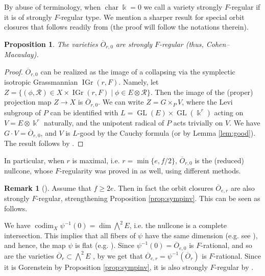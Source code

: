 \documentclass[11pt]{amsart}
\numberwithin{equation}{section}
\newtheorem{proposition}[equation]{Proposition}
\theoremstyle{definition}
\newtheorem{rmk}[equation]{Remark}
\newenvironment{remark}[1][]{\begin{rmk}[#1] \pushQED{\qed}}{\popQED \end{rmk}}
\DeclareMathOperator{\codim}{codim}
\DeclareMathOperator{\GL}{GL}
\DeclareMathOperator{\cha}{char}
\newcommand{\op}{\operatorname}
\newcommand{\oo}{\otimes}
\newcommand{\mc}{\mathcal}
\newcommand{\ol}{\overline}
\newcommand{\kk}{\Bbbk}
\begin{document}
By abuse of terminology, when $\cha \kk = 0$ we call a variety strongly $F$-regular if it is of strongly $F$-regular type. We mention a sharper result for special orbit closures that follows readily from \cite[Theorem 1.2]{me} (the proof will follow the notations therein).

\begin{proposition}\label{prop:special1}
The varieties $\ol{O}_{r,0}$ are strongly $F$-regular (thus, Cohen--Macaulay).
\end{proposition}

\begin{proof}
$\ol{O}_{r,0}$ can be realized as the image of a collapsing via the symplectic isotropic Grassmannian $\op{IGr}(r, F)$. Namely, let $Z=\{(\phi, \mc{R}) \in X \times \op{IGr}(r,F) \mid \phi \in E\oo \mc{R}\}$. Then the image of the (proper) projection map $Z \to X$ is $\ol{O}_{r,0}$. We can write $Z=G \times_P V$, where the Levi subgroup of $P$ can be identified with $L=\GL(E) \times \GL(\kk^{r})$ acting on $V=E\oo \kk^{r}$ naturally, and the unipotent radical of $P$ acts trivially on $V$. We have $G \cdot V = \ol{O}_{r,0}$, and $V$ is $L$-good by the Cauchy formula \cite[Theorem 2.3.2]{weymanbook} (or by Lemma \ref{lem:good}). The result follows by \cite[Theorems 1.2 and 1.3]{me}.
\end{proof}

In particular, when $r$ is maximal, i.e. $r=\min\{e,f/2\}$, $\ol{O}_{r,0}$ is the (reduced) nullcone, whose $F$-regularity was proved in \cite[Theorem 3.6]{vaib2} as well, using different methods. 

\begin{remark}\label{rem:infactFreg1}
Assume that $f\geq 2e$. Then in fact the orbit closures $\ol{O}_{e,r}$ are also strongly $F$-regular, strengthening Proposition \ref{prop:sympinv}. This can be seen as follows. 

We have $\codim_X \psi^{-1}(0) = \dim \bigwedge^2 E$, i.e. the nullcone is a complete intersection. This implies that all fibers of $\psi$ have the same dimension (e.g. see \cite[Section 8.1]{popvin}), and hence, the map $\psi$ is flat (e.g. \cite[Exercise 10.9]{hartshorne}). Since $\psi^{-1}(0)=\ol{O}_{e,0}$ is $F$-rational, and so are the varieties $\ol{O}_r \subset \bigwedge^2 E$ \cite{baetica}, by \cite[Theorem 4.3]{aberenes} we get that $\ol{O}_{e,r} = \psi^{-1}(\ol{O}_r)$ is $F$-rational. Since it is Gorenstein by Proposition \ref{prop:sympinv}, it is also strongly $F$-regular by \cite[Corollary 4.7]{hh}.
\end{remark}
\end{document}
